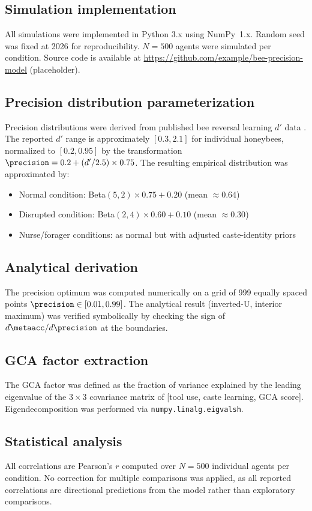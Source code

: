\subsection*{Simulation implementation}
\label{sec:methods:sim}

All simulations were implemented in Python 3.x using NumPy~1.x. Random seed was fixed at 2026
for reproducibility. $N = 500$ agents were simulated per condition. Source code is available at
\url{https://github.com/example/bee-precision-model} (placeholder).

\subsection*{Precision distribution parameterization}
\label{sec:methods:params}

Precision distributions were derived from published bee reversal learning $d'$ data
\cite{AvarWeber2012}. The reported $d'$ range is approximately $[0.3, 2.1]$ for individual
honeybees, normalized to $[0.2, 0.95]$ by the transformation
$\precision = 0.2 + (d'/2.5) \times 0.75$.
The resulting empirical distribution was approximated by:
\begin{itemize}
  \item Normal condition: Beta$(5, 2) \times 0.75 + 0.20$ (mean $\approx 0.64$)
  \item Disrupted condition: Beta$(2, 4) \times 0.60 + 0.10$ (mean $\approx 0.30$)
  \item Nurse/forager conditions: as normal but with adjusted caste-identity priors
\end{itemize}

\subsection*{Analytical derivation}
\label{sec:methods:deriv}

The precision optimum was computed numerically on a grid of 999 equally spaced points
$\precision \in [0.01, 0.99]$. The analytical result (inverted-U, interior maximum) was
verified symbolically by checking the sign of $d\metaacc/d\precision$ at the boundaries.

\subsection*{GCA factor extraction}
\label{sec:methods:gca}

The GCA factor was defined as the fraction of variance explained by the leading eigenvalue of the
$3 \times 3$ covariance matrix of [tool use, caste learning, GCA score]. Eigendecomposition was
performed via \texttt{numpy.linalg.eigvalsh}.

\subsection*{Statistical analysis}
\label{sec:methods:stats}

All correlations are Pearson's $r$ computed over $N = 500$ individual agents per condition.
No correction for multiple comparisons was applied, as all reported correlations are directional
predictions from the model rather than exploratory comparisons.
